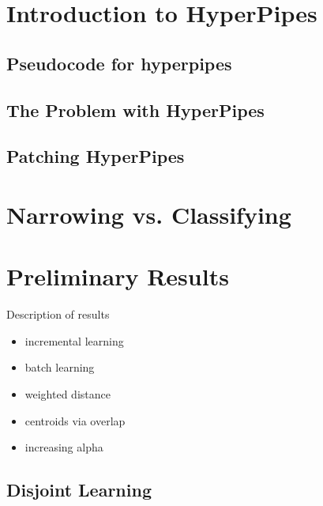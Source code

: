 \documentclass{acm_proc_article-sp}
\begin{document}


\section{Introduction to HyperPipes}



\subsection{Pseudocode for hyperpipes}



\subsection{The Problem with HyperPipes}



\subsection{Patching HyperPipes}



\section{Narrowing vs. Classifying}



\section{Preliminary Results}

Description of results
\begin{itemize}
	\item{incremental learning}
	\item{batch learning}
	\item{weighted distance}
	\item{centroids via overlap}
	\item{increasing alpha}
\end{itemize}

\subsection{Disjoint Learning}
\end{document}
